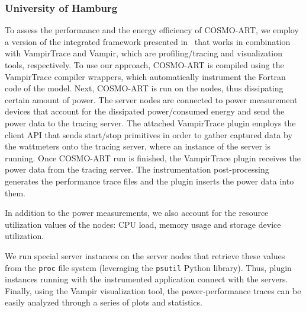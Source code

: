 \subsubsection{University of Hamburg}
To assess the  performance and the energy efficiency  of COSMO-ART, we
employ   a    version   of   the    integrated   framework   presented
in~\cite{energy13}  that  works in  combination  with VampirTrace  and
Vampir,   which  are   profiling/tracing   and  visualization   tools,
respectively.
To  use our  approach,  COSMO-ART is  compiled  using the  VampirTrace
compiler wrappers, which automatically  instrument the Fortran code of
the  model. Next,  COSMO-ART is  run  on the  nodes, thus  dissipating
certain  amount of  power.  The  server nodes  are connected  to power
measurement  devices that  account for  the  dissipated power/consumed
energy and  send the power data  to the tracing  server.  The attached
VampirTrace \pmlib plugin employs the client API that sends start/stop
primitives in order to gather captured data by the wattmeters onto the
tracing server,  where an  instance of the  \pmlib server  is running.
Once COSMO-ART run is finished, the VampirTrace \pmlib plugin receives
the  power   data  from  the  tracing   server.   The  instrumentation
post-processing generates  the performance trace files  and the \pmlib
plugin inserts the power data into them.

In  addition  to the  power  measurements,  we  also account  for  the
resource utilization values  of the nodes: CPU load,  memory usage and
storage device utilization. %

We  run special  \pmlib  server  instances on  the  server nodes  that
retrieve these  values from the \texttt{proc}  file system (leveraging
the  \texttt{psutil} Python library).   Thus, \pmlib  plugin instances
running  with the  instrumented  application connect  with the  \pmlib
servers.   Finally,   using  the   Vampir   visualization  tool,   the
power-performance traces  can be easily  analyzed through a  series of
plots and statistics.
